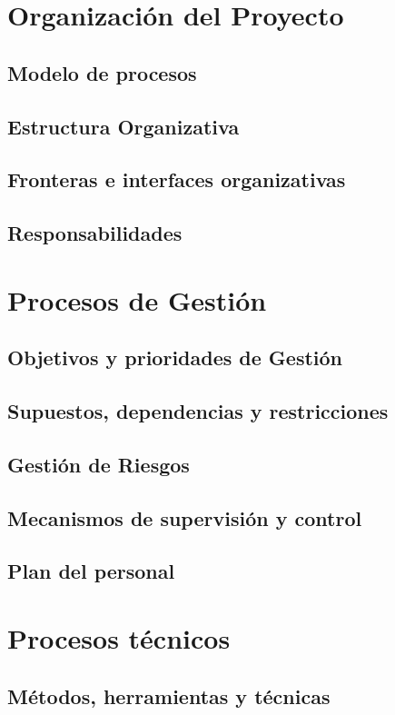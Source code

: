 \documentclass[11pt,a4paper,spanish,twoside]{report}
\begin{document}
\chapter{Organización del Proyecto}
\section{Modelo de procesos}
\section{Estructura Organizativa}
\section{Fronteras e interfaces organizativas}
\section{Responsabilidades}

\chapter{Procesos de Gestión}
\section{Objetivos y prioridades de Gestión}
\section{Supuestos, dependencias y restricciones}
\section{Gestión de Riesgos}
\section{Mecanismos de supervisión y control}
\section{Plan del personal}

\chapter{Procesos técnicos}
\section{Métodos, herramientas y técnicas}
\end{document}
